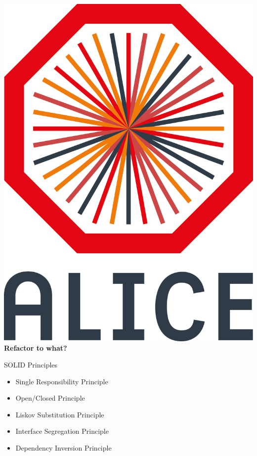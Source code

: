 \documentclass[aspectratio=169,14pt,dvipsnames]{beamer}
\begin{document}
\begin{frame}{\includegraphics[height=0.07\textheight]{2012-Jul-04-4_Color_Logo_CB.png} \hspace{0.2cm}\textbf{Refactor to what?}}
  \begin{block}{SOLID Principles}
    \begin{itemize}
      \item Single Responsibility Principle
      \item Open/Closed Principle
      \item Liskov Substitution Principle
      \item Interface Segregation Principle
      \item Dependency Inversion Principle
    \end{itemize}
  \end{block}
\end{frame}
\end{document}
